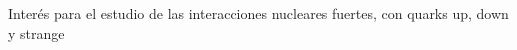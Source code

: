 \documentclass[preview]{standalone}
\begin{document}
\begin{center}
Interés para el estudio de las interacciones nucleares fuertes, con quarks up, down y strange
\end{center}
\end{document}
